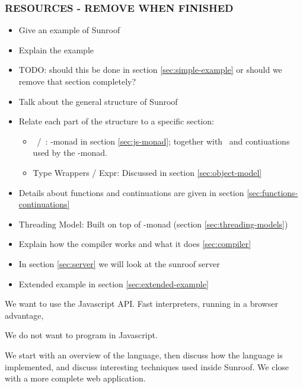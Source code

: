 \subsubsection{RESOURCES - REMOVE WHEN FINISHED}

\begin{itemize}
\item Give an example of Sunroof 
\item Explain the example
\item TODO: should this be done in section \ref{sec:simple-example} or should we remove that section completely?
\item Talk about the general structure of Sunroof
\item Relate each part of the structure to a specific section:
  \begin{itemize}
  \item \JSA\ /\ \JSB: \JS-monad in section \ref{sec:js-monad};
  together with \JSI\ and contiuations used by the \JS-monad.
  \item Type Wrappers / Expr: Discussed in section \ref{sec:object-model}
  \end{itemize}
\item Details about functions and continuations are given in section \ref{sec:functions-continuations}
\item Threading Model: Built on top of \JS-monad (section \ref{sec:threading-models})
\item Explain how the compiler works and what it does \ref{sec:compiler}
\item In section \ref{sec:server} we will look at the sunroof server 
\item Extended example in section \ref{sec:extended-example}
\end{itemize}


We want to use the Javascript API. Fast interpreters,
running in a browser advantage, 

We do not want to program in Javascript.

We start with an overview of the language, then discuss
how the language is implemented, and discuss interesting
techniques used inside Sunroof. We close with a more
complete web application.




